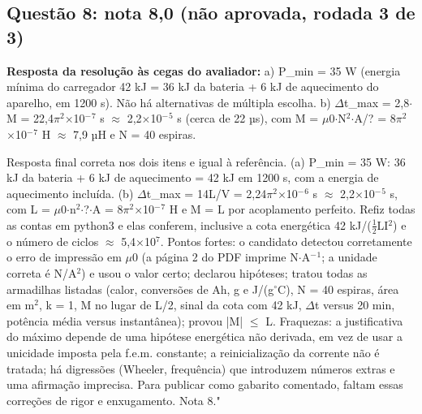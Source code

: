 \documentclass{article}%
\begin{document}
\subsection*{Questão 8: nota 8,0 (não aprovada, rodada 3 de 3)}%
\textbf{Resposta da resolução às cegas do avaliador:} a) P\_min = 35 W (energia mínima do carregador 42 kJ = 36 kJ da bateria + 6 kJ de aquecimento do aparelho, em 1200 s). Não há alternativas de múltipla escolha.\newline%
\newline%
b) $\Delta$t\_max = 2,8$\cdot$M = 22,4$\pi$$^2$$\times$10$^{-}$$^{7}$ s $\approx$ 2,2$\times$10$^{-}$$^{5}$ s (cerca de 22 µs), com M = $\mu$0$\cdot$N$^2$$\cdot$A/? = 8$\pi$$^2$$\times$10$^{-}$$^{7}$ H $\approx$ 7,9 µH e N = 40 espiras.\par %
Resposta final correta nos dois itens e igual à referência. (a) P\_min = 35 W: 36 kJ da bateria + 6 kJ de aquecimento = 42 kJ em 1200 s, com a energia de aquecimento incluída. (b) $\Delta$t\_max = 14L/V = 2,24$\pi$$^2$$\times$10$^{-}$$^{6}$ s $\approx$ 2,2$\times$10$^{-}$$^{5}$ s, com L = $\mu$0$\cdot$n$^2$$\cdot$?$\cdot$A = 8$\pi$$^2$$\times$10$^{-}$$^{7}$ H e M = L por acoplamento perfeito. Refiz todas as contas em python3 e elas conferem, inclusive a cota energética 42 kJ/($\frac12$LI$^2$) e o número de ciclos $\approx$ 5,4$\times$10$^{7}$. Pontos fortes: o candidato detectou corretamente o erro de impressão em $\mu$0 (a página 2 do PDF imprime N$\cdot$A$^{-}$$^{1}$; a unidade correta é N/A$^2$) e usou o valor certo; declarou hipóteses; tratou todas as armadilhas listadas (calor, conversões de Ah, g e J/(g$^\circ$C), N = 40 espiras, área em m$^2$, k = 1, M no lugar de L/2, sinal da cota com 42 kJ, $\Delta$t versus 20 min, potência média versus instantânea); provou |M| $\leq$ L. Fraquezas: a justificativa do máximo depende de uma hipótese energética não derivada, em vez de usar a unicidade imposta pela f.e.m. constante; a reinicialização da corrente não é tratada; há digressões (Wheeler, frequência) que introduzem números extras e uma afirmação imprecisa. Para publicar como gabarito comentado, faltam essas correções de rigor e enxugamento. Nota 8."%
$$
\end{document}
